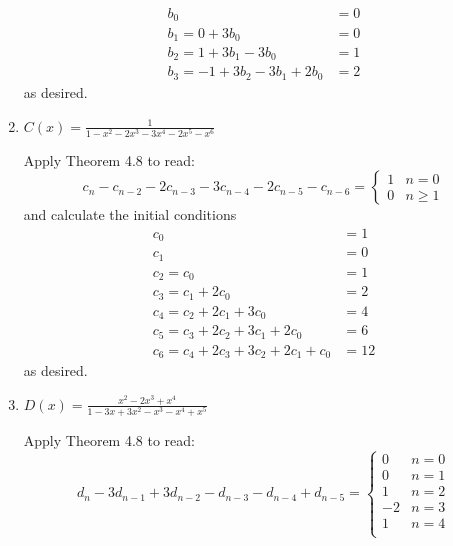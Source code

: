 \documentclass[class=math239,notes,tikz]{agony}
\begin{document}
\begin{enumerate}
\begin{sol}
          \begin{align*}
            b_0                           & = 0 \\
            b_1 = 0 + 3b_0                & = 0 \\
            b_2 = 1 + 3b_1 - 3b_0         & = 1 \\
            b_3 = -1 + 3b_2 - 3b_1 + 2b_0 & = 2
          \end{align*}
          as desired.
        \end{sol}
  \item $C(x) = \frac{1}{1 - x^2 - 2x^3 - 3x^4 - 2x^5 - x^6}$
        \begin{sol}
          Apply Theorem 4.8 to read:
          \[
            c_n - c_{n-2} - 2c_{n-3} - 3c_{n-4} - 2c_{n-5} - c_{n-6} = \begin{cases}
              1 & n = 0    \\
              0 & n \geq 1
            \end{cases}
          \]
          and calculate the initial conditions
          \begin{align*}
            c_0                                  & = 1  \\
            c_1                                  & = 0  \\
            c_2 = c_0                            & = 1  \\
            c_3 = c_1 + 2c_0                     & = 2  \\
            c_4 = c_2 + 2c_1 + 3c_0              & = 4  \\
            c_5 = c_3 + 2c_2 + 3c_1 + 2c_0       & = 6  \\
            c_6 = c_4 + 2c_3 + 3c_2 + 2c_1 + c_0 & = 12
          \end{align*}
          as desired.
        \end{sol}
  \item $D(x) = \frac{x^2 - 2x^3 + x^4}{1 - 3x + 3x^2 - x^3 - x^4 + x^5}$
        \begin{sol}
          Apply Theorem 4.8 to read:
          \[
            d_n - 3d_{n-1} + 3d_{n-2} - d_{n-3} - d_{n-4} + d_{n-5} = \begin{cases}
              0  & n = 0    \\
              0  & n = 1    \\
              1  & n = 2    \\
              -2 & n = 3    \\
              1  & n = 4    \\

\end{cases}\]
\end{sol}
\end{enumerate}
\end{document}
